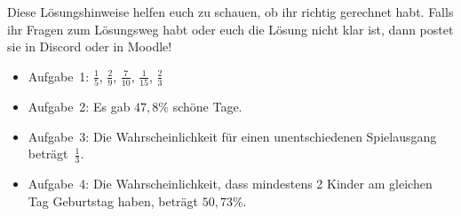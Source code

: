 \documentclass{cssheet}
\begin{document}
Diese Lösungshinweise helfen euch zu schauen, ob ihr richtig gerechnet habt. Falls ihr Fragen zum Lösungsweg habt oder euch die Lösung nicht klar ist, dann postet sie in Discord oder in Moodle!

\begin{itemize}
\item Aufgabe~1: $\frac{1}{5}$, $\frac{2}{9}$, $\frac{7}{10}$, $\frac{1}{15}$, $\frac{2}{3}$
\item Aufgabe~2: Es gab $47,8\%$ schöne Tage.
\item Aufgabe~3: Die Wahrscheinlichkeit für einen unentschiedenen Spielausgang beträgt~$\frac{1}{3}$.
\item Aufgabe~4: Die Wahrscheinlichkeit, dass mindestens 2 Kinder am gleichen Tag Geburtstag haben, beträgt $50,73\%$.
\end{itemize}

\vspace*{3cm}

\printlicense

\printsocials
\end{document}
